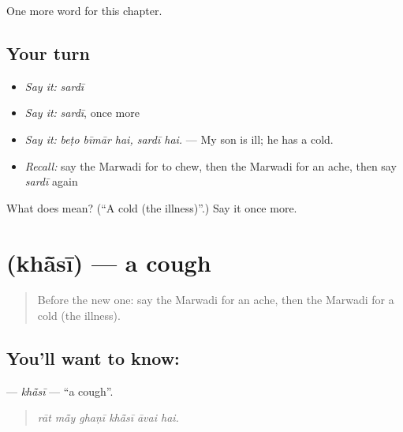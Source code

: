 \begin{grammarlens}[title={What you've built}]
One more word for this chapter.
\end{grammarlens}

\subsection*{Your turn}
\begin{itemize}
\raggedright
  \item \emph{Say it:} \emph{sardī}
  \item \emph{Say it:} \emph{sardī}, once more
  \item \emph{Say it:} \emph{beṭo bīmār hai, sardī hai.} — My son is ill; he has a cold.
  \item \emph{Recall:} say the Marwadi for to chew, then the Marwadi for an ache, then say \emph{sardī} again
\end{itemize}

\begin{tcolorbox}[breakable,colback=teal!4,colframe=teal!35!black,title={Before you move on}]
What does  mean? (\textquotedblleft{}A cold (the illness)\textquotedblright{}.) Say it once more.
\end{tcolorbox}
\section[\texorpdfstring{\mw{खांसी} (khā̃sī)}{खांसी (khā̃sī)}]{ (khā̃sī) — a cough}

\label{lesson:MW-C253-khasi}



\begin{quote}
Before the new one: say the Marwadi for an ache, then the Marwadi for a cold (the illness).
\end{quote}

\subsection*{You'll want to know: }
\textbf{} — \emph{khā̃sī} — \textquotedblleft{}a cough\textquotedblright{}.

\begin{quote}
     
\end{quote}

\begin{quote}
\emph{rāt mā̃y ghaṇī khā̃sī āvai hai.}
\end{quote}

